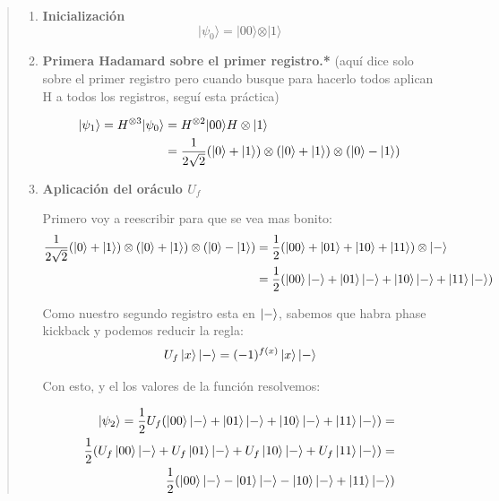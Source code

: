 \begin{quote}
    \begin{enumerate}
        \item \textbf{Inicialización }
            $$
            \vert \psi_0 \rangle = \vert 00 \rangle \otimes \vert 1 \rangle
            $$

        \item \textbf{Primera Hadamard sobre el primer registro.* } (aquí dice solo sobre
            el primer registro pero cuando busque para hacerlo todos aplican H a todos los
            registros, seguí esta práctica)

            \begin{align*}
                \vert \psi_1 \rangle = H^{\otimes 3} \vert \psi_0 \rangle  &=  H^{\otimes 2}\vert 00
                \rangle  H\otimes \vert 1 \rangle  \\ 
                                                                            &=  \frac{1}{2\sqrt{2}}
                                                                            (\ket{0}+\ket{1})
                                                                            \otimes (\ket{0}+\ket{1})
                                                                            \otimes (\ket{0}-\ket{1})\\
            \end{align*}

        \item \textbf{Aplicación del oráculo $U_f$}

            Primero voy a reescribir para que se vea mas bonito:
            \begin{align*}
                \frac{1}{2\sqrt{2}} (\ket{0}+\ket{1}) \otimes (\ket{0}+\ket{1}) \otimes
                (\ket{0}-\ket{1}) &= \frac{1}{2} (\ket{00} + \ket{01} + \ket{10} + \ket{11})
                \otimes \ket{-} \\
                                  &= \frac{1}{2} (\ket{00}\ket{-} + \ket{01}\ket{-} + \ket{10}\ket{-} + \ket{11}\ket{-}) 
            \end{align*}

            Como nuestro segundo registro esta en $\ket{-}$, sabemos que habra phase kickback y
            podemos reducir la regla:
            $$
            U_f \ket{x} \ket{-} = (-1)^{f(x)}  \ket{x} \ket{-}
            $$

            Con esto, y el los valores de la función resolvemos:

            \begin{align*}
                \ket{\psi_2} = \frac{1}{2} U_f(\ket{00}\ket{-} + \ket{01}\ket{-} + \ket{10}\ket{-} +
                \ket{11}\ket{-}) = \\ 
                \frac{1}{2} (U_f\ket{00}\ket{-} + U_f\ket{01}\ket{-} + U_f\ket{10}\ket{-} +
                U_f\ket{11}\ket{-}) = \\
                \frac{1}{2} (\ket{00}\ket{-} -\ket{01}\ket{-} -\ket{10}\ket{-}
                + \ket{11}\ket{-})
            \end{align*}


\end{enumerate}
\end{quote}

